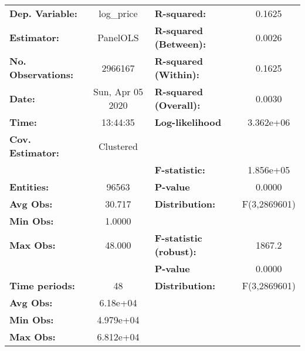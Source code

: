 \documentclass{report}
\begin{document}
\begin{center}
\begin{tabular}{lclc}
\toprule
\textbf{Dep. Variable:}      &     log\_price     & \textbf{  R-squared:         }   &      0.1625      \\
\textbf{Estimator:}          &      PanelOLS      & \textbf{  R-squared (Between):}  &      0.0026      \\
\textbf{No. Observations:}   &      2966167       & \textbf{  R-squared (Within):}   &      0.1625      \\
\textbf{Date:}               &  Sun, Apr 05 2020  & \textbf{  R-squared (Overall):}  &      0.0030      \\
\textbf{Time:}               &      13:44:35      & \textbf{  Log-likelihood     }   &    3.362e+06     \\
\textbf{Cov. Estimator:}     &     Clustered      & \textbf{                     }   &                  \\
\textbf{}                    &                    & \textbf{  F-statistic:       }   &    1.856e+05     \\
\textbf{Entities:}           &       96563        & \textbf{  P-value            }   &      0.0000      \\
\textbf{Avg Obs:}            &       30.717       & \textbf{  Distribution:      }   &   F(3,2869601)   \\
\textbf{Min Obs:}            &       1.0000       & \textbf{                     }   &                  \\
\textbf{Max Obs:}            &       48.000       & \textbf{  F-statistic (robust):} &      1867.2      \\
\textbf{}                    &                    & \textbf{  P-value            }   &      0.0000      \\
\textbf{Time periods:}       &         48         & \textbf{  Distribution:      }   &   F(3,2869601)   \\
\textbf{Avg Obs:}            &      6.18e+04      & \textbf{                     }   &                  \\
\textbf{Min Obs:}            &     4.979e+04      & \textbf{                     }   &                  \\
\textbf{Max Obs:}            &     6.812e+04      & \textbf{                     }   &                  \\
\bottomrule
\end{tabular}
\begin{tabular}{lcccccc}

\end{tabular}
\end{center}
\end{document}
